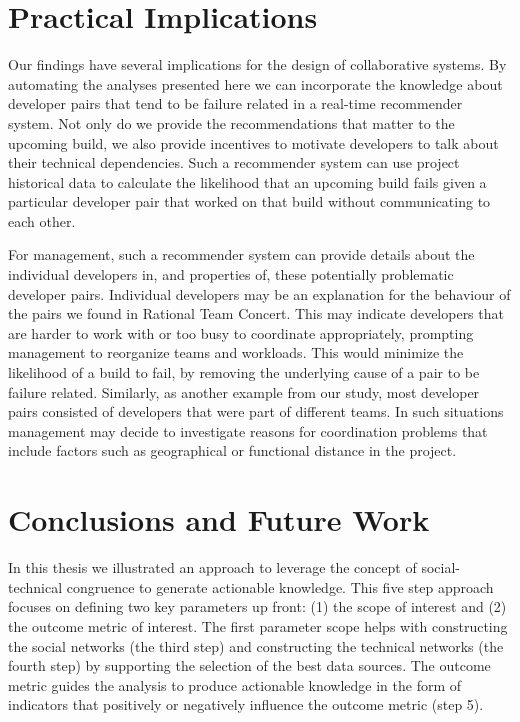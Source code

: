 \section{Practical Implications}
\label{sec:implications}
Our findings have several implications for the design of collaborative systems.
By automating the analyses presented here we can incorporate the knowledge about
developer pairs that tend to be failure related in a real-time recommender
system. Not only do we provide the recommendations that matter to the upcoming
build, we also provide incentives to motivate developers to talk about their
technical dependencies. 
%
Such a recommender system can use project historical data to
calculate the likelihood that an upcoming build fails given a particular
developer pair that worked on that build without communicating to each other.

For management, such a recommender system can provide details about the
individual developers in, and properties of, these potentially problematic
developer pairs. Individual developers may be an explanation for the behaviour of
the pairs we found in Rational Team Concert. This may indicate developers that are
harder to work with or too busy to coordinate appropriately, prompting management
to reorganize teams and workloads. This would minimize the likelihood of a build
to fail, by removing the underlying cause of a pair to be failure related.
Similarly, as another example from our study, most developer pairs
consisted of developers that were part of different teams. In such
situations management may decide to investigate reasons for coordination
problems that include factors such as geographical or functional distance in the project.




\section{Conclusions and Future Work}
\label{ch:dis:con}
In this thesis we illustrated an approach to leverage the concept of social-technical congruence to generate actionable knowledge.
This five step approach focuses on defining two key parameters up front: (1) the scope of interest and (2) the outcome metric of interest.
The first parameter scope helps with constructing the social networks (the third step) and constructing the technical networks (the fourth step) by supporting the selection of the best data sources.
The outcome metric guides the analysis to produce actionable knowledge in the form of indicators that positively or negatively influence the outcome metric (step 5). 


